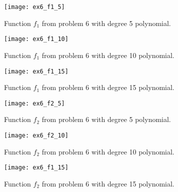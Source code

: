 \documentclass[12pt, a4paper]{article}
\begin{document}
\begin{figure}
\texttt{[image: ex6\_f1\_5]}
\caption{Function $f_1$ from problem 6 with degree 5 polynomial.}
\label{fig:ex6_f1_5}
\end{figure}
\begin{figure}
\texttt{[image: ex6\_f1\_10]}
\caption{Function $f_1$ from problem 6 with degree 10 polynomial.}
\label{fig:ex6_f1_10}
\end{figure}
\begin{figure}
\texttt{[image: ex6\_f1\_15]}
\caption{Function $f_1$ from problem 6 with degree 15 polynomial.}
\label{fig:ex6_f1_15}
\end{figure}
\begin{figure}
\texttt{[image: ex6\_f2\_5]}
\caption{Function $f_2$ from problem 6 with degree 5 polynomial.}
\label{fig:ex6_f2_5}
\end{figure}
\begin{figure}
\texttt{[image: ex6\_f2\_10]}
\caption{Function $f_2$ from problem 6 with degree 10 polynomial.}
\label{fig:ex6_f2_10}
\end{figure}
\begin{figure}
\texttt{[image: ex6\_f1\_15]}
\caption{Function $f_2$ from problem 6 with degree 15 polynomial.}
\label{fig:ex6_f2_15}
\end{figure}
\end{document}
